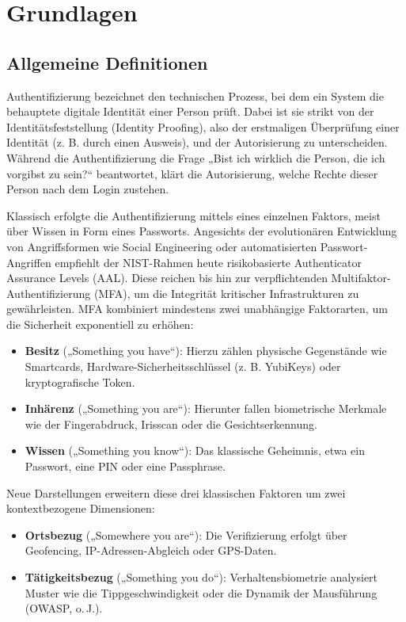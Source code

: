 \section{Grundlagen}

\subsection{Allgemeine Definitionen}
Authentifizierung bezeichnet den technischen Prozess, bei dem ein System die behauptete digitale Identität einer Person prüft. Dabei ist sie strikt von der Identitätsfeststellung (Identity Proofing), also der erstmaligen Überprüfung einer Identität (z. B. durch einen Ausweis), und der Autorisierung zu unterscheiden. Während die Authentifizierung die Frage „Bist ich wirklich die Person, die ich vorgibst zu sein?“ beantwortet, klärt die Autorisierung, welche Rechte dieser Person nach dem Login zustehen.

Klassisch erfolgte die Authentifizierung mittels eines einzelnen Faktors, meist über Wissen in Form eines Passworts. Angesichts der evolutionären Entwicklung von Angriffsformen wie Social Engineering oder automatisierten Passwort-Angriffen empfiehlt der NIST-Rahmen heute risikobasierte Authenticator Assurance Levels (AAL). Diese reichen bis hin zur verpflichtenden Multifaktor-Authentifizierung (MFA), um die Integrität kritischer Infrastrukturen zu gewährleisten.
MFA kombiniert mindestens zwei unabhängige Faktorarten, um die Sicherheit exponentiell zu erhöhen:
\begin{itemize}
    \item \textbf{Besitz} („Something you have“): Hierzu zählen physische Gegenstände wie Smartcards, Hardware-Sicherheitsschlüssel (z. B. YubiKeys) oder kryptografische Token.
    \item \textbf{Inhärenz} („Something you are“): Hierunter fallen biometrische Merkmale wie der Fingerabdruck, Irisscan oder die Gesichtserkennung.
    \item \textbf{Wissen} („Something you know“): Das klassische Geheimnis, etwa ein Passwort, eine PIN oder eine Passphrase.
\end{itemize}


Neue Darstellungen erweitern diese drei klassischen Faktoren um zwei kontextbezogene Dimensionen: 
\begin{itemize}
    \item \textbf{Ortsbezug} („Somewhere you are“): Die Verifizierung erfolgt über Geofencing, IP-Adressen-Abgleich oder GPS-Daten.
    \item \textbf{Tätigkeitsbezug} („Something you do“): Verhaltensbiometrie analysiert Muster wie die Tippgeschwindigkeit oder die Dynamik der Mausführung (OWASP, o.\,J.).
\end{itemize}


